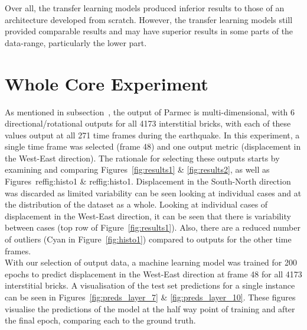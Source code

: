 \noindent
Over all, the transfer learning models produced inferior results to those of an architecture developed from scratch. However, the transfer learning models still provided comparable results and may have superior results in some parts of the data-range, particularly the lower part.

\section{Whole Core Experiment}

As mentioned in subsection~\label{data:outputs}, the output of Parmec is multi-dimensional, with 6 directional/rotational outputs for all 4173 interstitial bricks, with each of these values output at all 271 time frames during the earthquake. In this experiment, a single time frame was selected (frame 48) and one output metric (displacement in the West-East direction). The rationale for selecting these outputs starts by examining and comparing Figures~\ref{fig:results1} \& \ref{fig:results2}, as well as Figures~ref{fig:histo1} \& ref{fig:histo1}. Displacement in the South-North direction was discarded as limited variability can be seen looking at individual cases and at the distribution of the dataset as a whole. Looking at individual cases of displacement in the West-East direction, it can be seen that there is variability between cases (top row of Figure~\ref{fig:results1}). Also, there are a reduced number of outliers (Cyan in Figure~\ref{fig:histo1}) compared to outputs for the other time frames. 
\\

\noindent
With our selection of output data, a machine learning model was trained for 200 epochs to predict displacement in the West-East direction at frame 48 for all 4173 interstitial bricks. A visualisation of the test set predictions for a single instance can be seen in Figures~\ref{fig:preds_layer_7} \& \ref{fig:preds_layer_10}. These figures visualise the predictions of the model at the half way point of training and after the final epoch, comparing each to the ground truth.
\\

